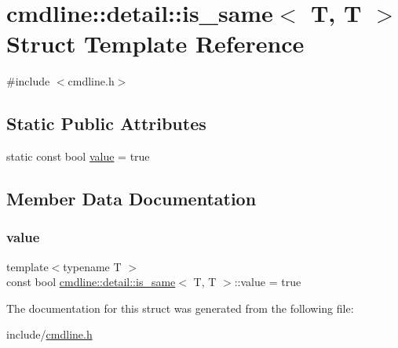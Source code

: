 \hypertarget{structcmdline_1_1detail_1_1is__same_3_01_t_00_01_t_01_4}{}\section{cmdline\+::detail\+::is\+\_\+same$<$ T, T $>$ Struct Template Reference}
\label{structcmdline_1_1detail_1_1is__same_3_01_t_00_01_t_01_4}


{\ttfamily \#include $<$cmdline.\+h$>$}

\subsection*{Static Public Attributes}
\begin{DoxyCompactItemize}
\item 
static const bool \mbox{\hyperlink{structcmdline_1_1detail_1_1is__same_3_01_t_00_01_t_01_4_a5640f6fc005b679b1e051f7e050205e5}{value}} = true
\end{DoxyCompactItemize}


\subsection{Member Data Documentation}
\mbox{\label{structcmdline_1_1detail_1_1is__same_3_01_t_00_01_t_01_4_a5640f6fc005b679b1e051f7e050205e5}} 
\subsubsection{\texorpdfstring{value}{value}}
{\footnotesize\ttfamily template$<$typename T $>$ \\
const bool \mbox{\hyperlink{structcmdline_1_1detail_1_1is__same}{cmdline\+::detail\+::is\+\_\+same}}$<$ T, T $>$\+::value = true\hspace{0.3cm}{\ttfamily [static]}}



The documentation for this struct was generated from the following file\+:\begin{DoxyCompactItemize}
\item 
include/\mbox{\hyperlink{cmdline_8h}{cmdline.\+h}}\end{DoxyCompactItemize}
